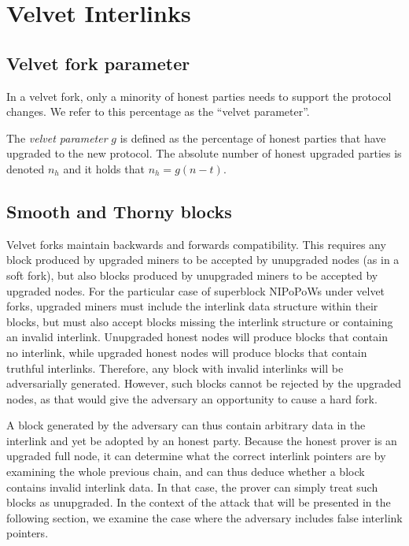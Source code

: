 \section{Velvet Interlinks}
\subsection{Velvet fork parameter}
In a velvet fork, only a minority of honest parties needs to support the protocol
changes. We refer to this percentage as the ``velvet parameter''.

\begin{definition}
	The \emph{velvet parameter} $g$ is defined as the percentage of honest parties
	that have upgraded to the new protocol. The absolute number of honest upgraded
	parties is denoted $n_h$ and it holds that
	$n_h = g (n - t)$.
	\label{defn:velvet_honest_majority}
\end{definition}

\subsection{Smooth and Thorny blocks}
Velvet forks maintain backwards and forwards compatibility. This requires any block produced by upgraded miners to be accepted by unupgraded nodes (as in a soft fork), but also blocks produced by unupgraded miners to be accepted by upgraded nodes. For the particular case of superblock NIPoPoWs under velvet forks, upgraded miners must include the interlink data structure within their blocks, but must also accept blocks missing the interlink structure or containing an invalid interlink. Unupgraded honest nodes will produce blocks that contain no interlink, while upgraded honest nodes will produce blocks that contain truthful interlinks. Therefore, any block with invalid interlinks will be adversarially generated. However, such blocks cannot be rejected by the upgraded nodes, as that would give the adversary an opportunity to cause a hard fork.

A block generated by the adversary can thus contain arbitrary data in the interlink and yet be adopted by an honest party. Because the honest prover is an upgraded full node, it can determine what the correct interlink pointers are by examining the whole previous chain, and can thus deduce whether a block contains invalid interlink data. In that case, the prover can simply treat such blocks as unupgraded. In the context of the attack that will be presented in the following section, we examine the case where the adversary includes false interlink pointers.

